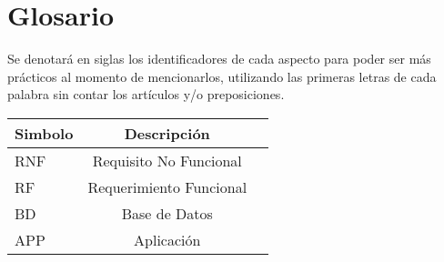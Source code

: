 \section{Glosario}

Se denotará en siglas los identificadores de cada aspecto para poder ser más prácticos al momento de mencionarlos, utilizando las primeras letras de cada palabra sin contar los artículos y/o preposiciones.

\label{sec:theory}

\begin{tabular}{|l | c | r|}
	\hline
	Simbolo & Descripción\\
	\hline\hline
	RNF & Requisito No Funcional\\
	\hline
	RF & Requerimiento Funcional\\
	\hline
	BD & Base de Datos\\
	\hline
	APP & Aplicación\\
	\hline
\end{tabular}
